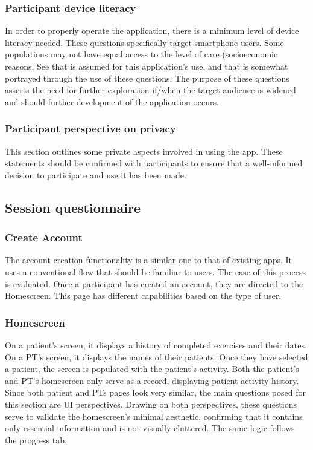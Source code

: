 \documentclass[12pt, titlepage]{article}
\begin{document}
\subsubsection{\textbf{Participant device literacy}}
In order to properly operate the application, there is a minimum level of device literacy needed. These questions specifically
target smartphone users. Some populations may not have equal access to the level of care (socioeconomic reasons, See that is assumed 
for this application's use, and that is somewhat portrayed through the use of these questions. The purpose of these questions asserts the
need for further exploration if/when the target audience is widened and should further development of the application occurs. \\  %

\subsubsection{\textbf{Participant perspective on privacy}}
This section outlines some private aspects involved in using the app. These statements 
should be confirmed with participants to ensure that a well-informed decision to participate and use it has been made.

\subsection{Session questionnaire}
\subsubsection{Create Account}
The account creation functionality is a similar one to that of existing apps. It uses a conventional flow that should be familiar to users.
The ease of this process is evaluated. 
Once a participant has created an account, they are directed to the Homescreen. This page has different capabilities based
on the type of user. \\
\subsubsection{Homescreen}
On a patient's screen, it displays a history of completed exercises and their dates. %
On a PT's screen, it displays the names of their patients. Once they have selected a patient, the screen is populated
with the patient's activity. Both the patient's and PT's homescreen only serve as a record, displaying patient activity history. 
Since both patient and PTs pages look very similar, the main questions posed for this section are
UI perspectives. Drawing on both perspectives, these questions serve to validate the homescreen's minimal aesthetic,
confirming that it contains only essential information and is not visually cluttered. The same logic follows the progress
tab. \\
\end{document}
